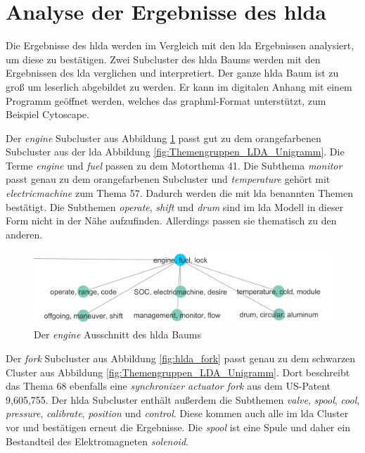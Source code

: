  
 
 
 
 
 


\section{Analyse der Ergebnisse des \gls{hlda}}

Die Ergebnisse des \gls{hlda} werden im Vergleich mit den \gls{lda} Ergebnissen analysiert, um diese zu bestätigen. Zwei Subcluster des \gls{hlda} Baums werden mit den Ergebnissen des \gls{lda} verglichen und interpretiert. Der ganze \gls{hlda} Baum ist zu groß um leserlich abgebildet zu werden. Er kann im digitalen Anhang mit einem Programm geöffnet werden, welches das graphml-Format unterstützt, zum Beispiel Cytoscape.


Der \emph{engine} Subcluster aus Abbildung \ref{fig:hlda_engine} passt gut zu dem orangefarbenen Subcluster aus der \gls{lda} Abbildung \ref{fig:Themengruppen_LDA_Unigramm}. Die Terme \emph{engine} und \emph{fuel} passen zu dem Motorthema 41. Die Subthema \emph{monitor} passt genau zu dem orangefarbenen Subcluster und \emph{temperature} gehört mit \emph{electricmachine} zum Thema 57. Dadurch werden die mit \gls{lda} benannten Themen bestätigt. Die Subthemen \emph{operate}, \emph{shift} und \emph{drum} sind im \gls{lda} Modell in dieser Form nicht in der Nähe aufzufinden. Allerdings passen sie thematisch zu den anderen.

\begin{figure}[htpb]
	\centering
	\includegraphics[width=\textwidth,keepaspectratio=true]{img/hldaEngine.png}
	\caption{
		Der \emph{engine} Ausschnitt des \gls{hlda} Baums
	}
	\label{fig:hlda_engine}
\end{figure}

Der \emph{fork} Subcluster aus Abbildung \ref{fig:hlda_fork} passt genau zu dem schwarzen Cluster aus Abbildung \ref{fig:Themengruppen_LDA_Unigramm}. Dort beschreibt das Thema 68 ebenfalls eine \emph{synchronizer actuator fork} aus dem US-Patent 9,605,755. Der \gls{hlda} Subcluster enthält außerdem die Subthemen \emph{valve}, \emph{spool}, \emph{cool}, \emph{pressure}, \emph{calibrate}, \emph{position} und \emph{control}. Diese kommen auch alle im \gls{lda} Cluster vor und bestätigen erneut die Ergebnisse. Die \emph{spool} ist eine Spule und daher ein Bestandteil des Elektromagneten \emph{solenoid}.

